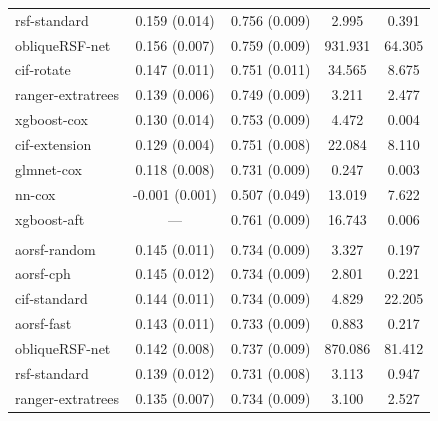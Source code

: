 \documentclass[12pt]{article}\usepackage[]{graphicx}\usepackage[]{xcolor}
\newenvironment{knitrout}{}{} %
\begin{document}
\begin{knitrout}
\begin{longtable}[t]{lcccc}
\hspace{1em}rsf-standard & 0.159 (0.014) & 0.756 (0.009) & 2.995 & 0.391\\
\hspace{1em}obliqueRSF-net & 0.156 (0.007) & 0.759 (0.009) & 931.931 & 64.305\\
\hspace{1em}cif-rotate & 0.147 (0.011) & 0.751 (0.011) & 34.565 & 8.675\\
\hspace{1em}ranger-extratrees & 0.139 (0.006) & 0.749 (0.009) & 3.211 & 2.477\\
\hspace{1em}xgboost-cox & 0.130 (0.014) & 0.753 (0.009) & 4.472 & 0.004\\
\hspace{1em}cif-extension & 0.129 (0.004) & 0.751 (0.008) & 22.084 & 8.110\\
\hspace{1em}glmnet-cox & 0.118 (0.008) & 0.731 (0.009) & 0.247 & 0.003\\
\hspace{1em}nn-cox & -0.001 (0.001) & 0.507 (0.049) & 13.019 & 7.622\\
\hspace{1em}xgboost-aft & --- & 0.761 (0.009) & 16.743 & 0.006\\
\addlinespace[0.3em]
\multicolumn{5}{l}{\textit{\textbf{Rotterdam tumor bank; recurrence, n = 2982, p = 11}}}\\
\hline
\hspace{1em}aorsf-random & 0.145 (0.011) & 0.734 (0.009) & 3.327 & 0.197\\
\hspace{1em}aorsf-cph & 0.145 (0.012) & 0.734 (0.009) & 2.801 & 0.221\\
\hspace{1em}cif-standard & 0.144 (0.011) & 0.734 (0.009) & 4.829 & 22.205\\
\hspace{1em}aorsf-fast & 0.143 (0.011) & 0.733 (0.009) & 0.883 & 0.217\\
\hspace{1em}obliqueRSF-net & 0.142 (0.008) & 0.737 (0.009) & 870.086 & 81.412\\
\hspace{1em}rsf-standard & 0.139 (0.012) & 0.731 (0.008) & 3.113 & 0.947\\
\hspace{1em}ranger-extratrees & 0.135 (0.007) & 0.734 (0.009) & 3.100 & 2.527\\

\end{longtable}
\end{knitrout}
\end{document}
